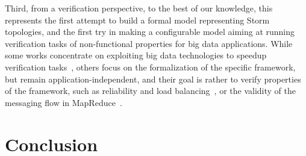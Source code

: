 \documentclass[smallextended]{svjour3}       %
\begin{document}
Third, from a verification perspective, to the best of our knowledge, this represents the first attempt to build a formal model representing Storm topologies, and the first try in making a configurable model aiming at running verification tasks of non-functional properties for big data applications. While some works concentrate on exploiting big data technologies to speedup verification tasks~\cite{camilli2014}, others focus on the formalization of the specific framework, but remain application-independent, and their goal is rather to verify properties of the framework, such as reliability and load balancing~\cite{dicomputational}, or the validity of the messaging flow in MapReduce~\cite{yang2010formalizing}.
%
%


\section{Conclusion}
%
\label{conc}

\end{document}
